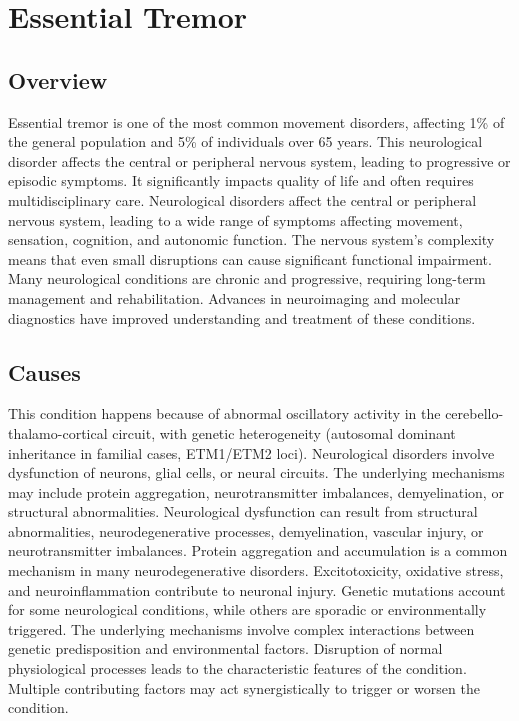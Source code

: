 \chapter{Essential Tremor}
\label{sec:Essential Tremor}

\section{Overview}
Essential tremor is one of the most common movement disorders, affecting 1\% of the general population and 5\% of individuals over 65 years. This neurological disorder affects the central or peripheral nervous system, leading to progressive or episodic symptoms. It significantly impacts quality of life and often requires multidisciplinary care. Neurological disorders affect the central or peripheral nervous system, leading to a wide range of symptoms affecting movement, sensation, cognition, and autonomic function. The nervous system's complexity means that even small disruptions can cause significant functional impairment. Many neurological conditions are chronic and progressive, requiring long-term management and rehabilitation. Advances in neuroimaging and molecular diagnostics have improved understanding and treatment of these conditions.
\section{Causes}
This condition happens because of abnormal oscillatory activity in the cerebello-thalamo-cortical circuit, with genetic heterogeneity (autosomal dominant inheritance in familial cases, ETM1/ETM2 loci). Neurological disorders involve dysfunction of neurons, glial cells, or neural circuits. The underlying mechanisms may include protein aggregation, neurotransmitter imbalances, demyelination, or structural abnormalities. Neurological dysfunction can result from structural abnormalities, neurodegenerative processes, demyelination, vascular injury, or neurotransmitter imbalances. Protein aggregation and accumulation is a common mechanism in many neurodegenerative disorders. Excitotoxicity, oxidative stress, and neuroinflammation contribute to neuronal injury. Genetic mutations account for some neurological conditions, while others are sporadic or environmentally triggered. The underlying mechanisms involve complex interactions between genetic predisposition and environmental factors. Disruption of normal physiological processes leads to the characteristic features of the condition. Multiple contributing factors may act synergistically to trigger or worsen the condition.
